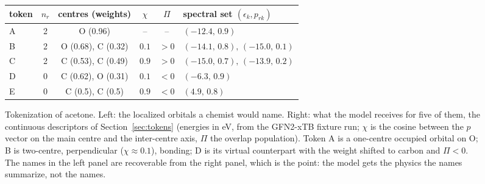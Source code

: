 \documentclass[11pt,a4paper]{article}
\newcommand{\lonepair}[2]{%
  \node[lp] at ($#1+(#2:0.30)+(#2+90:0.07)$) {};
  \node[lp] at ($#1+(#2:0.30)+(#2-90:0.07)$) {};}
\begin{document}
\begin{figure}[t]
\centering
{}

\vspace{6pt}
\begin{tabular}{@{}lccccl@{}}
\toprule
token & $n_r$ & centres (weights) & $\chi$ & $\Pi$ & spectral set $(\epsilon_k,p_{rk})$\\
\midrule
A & 2 & O (0.96) & -- & -- & $(-12.4,\,0.9)$\\
B & 2 & O (0.68), C (0.32) & $0.1$ & $>0$ & $(-14.1,\,0.8),\,(-15.0,\,0.1)$\\
C & 2 & C (0.53), C (0.49) & $0.9$ & $>0$ & $(-15.0,\,0.7),\,(-13.9,\,0.2)$\\
D & 0 & C (0.62), O (0.31) & $0.1$ & $<0$ & $(-6.3,\,0.9)$\\
E & 0 & C (0.5), C (0.5) & $0.9$ & $<0$ & $(4.9,\,0.8)$\\
\bottomrule
\end{tabular}
\caption{Tokenization of acetone. Left: the localized orbitals a chemist would name. Right: what the model receives for five of them, the continuous descriptors of Section~\ref{sec:tokens} (energies in eV, from the GFN2-xTB fixture run; $\chi$ is the cosine between the $p$ vector on the main centre and the inter-centre axis, $\Pi$ the overlap population). Token A is a one-centre occupied orbital on O; B is two-centre, perpendicular ($\chi\approx0.1$), bonding; D is its virtual counterpart with the weight shifted to carbon and $\Pi<0$. The names in the left panel are recoverable from the right panel, which is the point: the model gets the physics the names summarize, not the names.}
\label{fig:tokens}
\end{figure}
\end{document}
